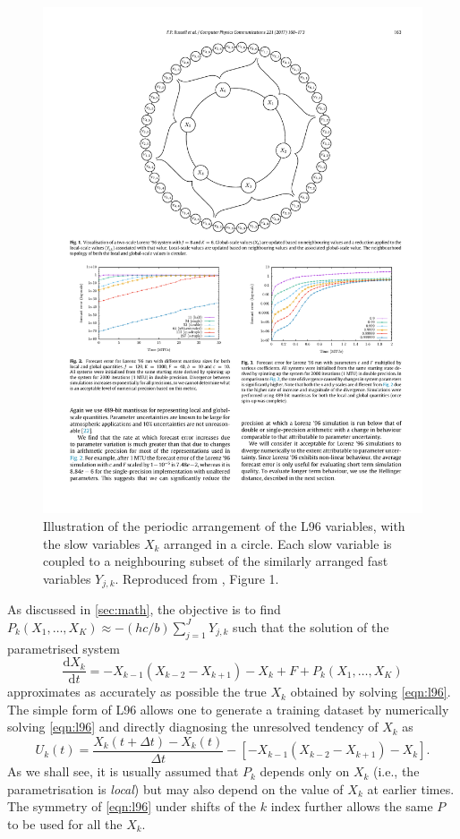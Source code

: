 \documentclass[titlepage,twoside]{article}
\numberwithin{equation}{section}
\newcommand{\diff}[2]{\frac{\mathrm{d} #1}{\mathrm{d} #2}}
\begin{document}
\begin{figure}[ht]
    \centering
    \includegraphics[width=0.7\linewidth]{figures/russell2017_L96_diagram.pdf}
    \caption{
        Illustration of the periodic arrangement of the L96 variables,
        with the slow variables $X_k$ arranged in a circle. Each slow variable
        is coupled to a neighbouring subset of the similarly arranged fast
        variables $Y_{j,k}$. Reproduced from \textcite{russell2017}, Figure 1.
    }
    \label{fig:L96_diagram}
\end{figure}

As discussed in \cref{sec:math}, the objective is to find $P_k(X_1, \dots, X_K)
\approx -(hc/b) \sum_{j=1}^J Y_{j,k}$ such that the solution of the
parametrised system
\begin{equation*}
    \diff{X_k}{t}
        = -X_{k-1} (X_{k-2} - X_{k+1}) - X_k + F + P_k(X_1, \dots, X_K)
\end{equation*}
approximates as accurately as possible the true $X_k$ obtained by solving
\cref{eqn:l96}. The simple form of L96 allows one to generate a training
dataset by numerically solving \cref{eqn:l96} and directly diagnosing the
unresolved tendency of $X_k$ as
\begin{equation*}
    U_k(t) = \frac{X_k(t + \Delta t) - X_k(t)}{\Delta t}
        - \left[ -X_{k-1} (X_{k-2} - X_{k+1}) - X_k \right].
\end{equation*}
As we shall see, it is usually assumed that $P_k$ depends only
on $X_k$ (i.e., the parametrisation is \emph{local}) but may also depend on the
value of $X_k$ at earlier times. The symmetry of \cref{eqn:l96} under shifts of
the $k$ index further allows the same $P$ to be used for all the $X_k$.
\end{document}

